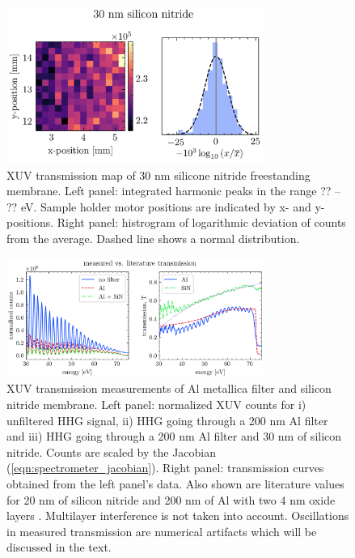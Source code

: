 \begin{figure}
	\centering
	\includegraphics[width=0.75\textwidth]{figures/chap3/nitride_map.png}
	\caption{XUV transmission map of 30 nm silicone nitride freestanding membrane. Left panel: integrated harmonic peaks in the range ?? -- ?? eV. Sample holder motor positions are indicated by x- and y-positions. Right panel: histrogram of logarithmic deviation of counts from the average. Dashed line shows a normal distribution.}
	\label{fig:nitride_map}
\end{figure}

\begin{figure}
	\centering
	\includegraphics[width=0.75\textwidth]{figures/chap3/SiN_Al_transmission.png}
	\caption{XUV transmission measurements of Al metallica filter and silicon nitride membrane. Left panel: normalized XUV counts for i) unfiltered HHG signal, ii) HHG going through a 200 nm Al filter and iii) HHG going through a 200 nm Al filter and 30 nm of silicon nitride. Counts are scaled by the Jacobian (\cref{eqn:spectrometer_jacobian}). Right panel: transmission curves obtained from the left panel's data. Also shown are literature values for 20 nm of silicon nitride and 200 nm of Al with two 4 nm oxide layers \cite{gulliksonCXROXRayInteractions}. Multilayer interference is not taken into account. Oscillations in measured transmission are numerical artifacts which will be discussed in the text.}
	\label{fig:SiN_Al_transmission}
\end{figure}

